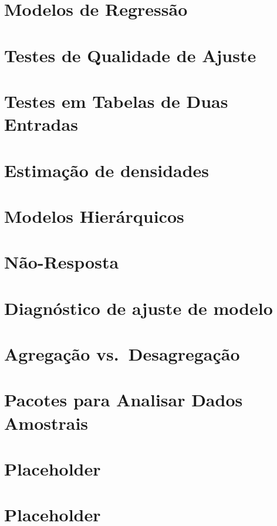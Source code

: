 \documentclass[]{book}
\theoremstyle{definition}
\theoremstyle{definition}
\theoremstyle{remark}
\begin{document}
\chapter{Modelos de Regressão}\label{modreg}

\chapter{Testes de Qualidade de Ajuste}\label{testqualajust}

\chapter{Testes em Tabelas de Duas Entradas}\label{testetab2}

\chapter{Estimação de densidades}\label{estimacao-de-densidades}

\chapter{Modelos Hierárquicos}\label{modelos-hierarquicos}

\chapter{Não-Resposta}\label{nao-resposta}

\chapter{Diagnóstico de ajuste de
modelo}\label{diagnostico-de-ajuste-de-modelo}

\chapter{Agregação vs.~Desagregação}\label{agregdesag}

\chapter{Pacotes para Analisar Dados Amostrais}\label{pacotes}

\chapter{Placeholder}\label{placeholder}

\chapter{Placeholder}\label{placeholder-1}


\end{document}
